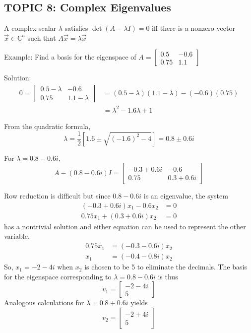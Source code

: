 \documentclass[12pt]{article} %
\begin{document}
\subsection{TOPIC 8: Complex Eigenvalues}
A complex scalar $\lambda$ satisfies $\det(A - \lambda I) = 0$ iff there is a nonzero vector $\vec{x} \in \mathbb{C}^n$ such that $A \vec{x} = \lambda \vec{x}$

Example: Find a basis for the eigenspace of $A = \begin{bmatrix}
	0.5 & -0.6\\
	0.75 & 1.1
\end{bmatrix}$

Solution:
\begin{align*}
	0 = \begin{vmatrix}
		0.5 - \lambda & -0.6\\
		0.75 & 1.1 - \lambda
	\end{vmatrix} &= (0.5 - \lambda)(1.1 - \lambda)- (-0.6)(0.75)\\
	&= \lambda^2 -1.6 \lambda + 1
\end{align*}

From the quadratic formula,
$$\lambda = \frac{1}{2}[1.6 \pm \sqrt{(-1.6)^2 - 4}] = 0.8 \pm 0.6i$$

For $\lambda = 0.8 - 0.6i$, 
$$A - (0.8 - 0.6i)I = \begin{bmatrix}
	-0.3 + 0.6i & -0.6\\
	0.75 & 0.3 + 0.6i
\end{bmatrix}$$

Row reduction is difficult but since $0.8 - 0.6i$ is an eigenvalue, the system 
\begin{align*}
	(-0.3 + 0.6i)x_1 - 0.6x_2 &= 0\\
	0.75x_1 + (0.3 + 0.6i)x_2 &= 0
\end{align*}
has a nontrivial solution and either equation can be used to represent the other variable. 
\begin{align*}
	0.75x_1 &= (-0.3-0.6i)x_2\\
	x_1 &= (-0.4 - 0.8i)x_2
\end{align*}
So, $x_1 = -2 - 4i$ when $x_2$ is chosen to be 5 to eliminate the decimals. The basis for the eigenspace corresponding to $\lambda = 0.8 - 0.6i$ is thus 
$$v_1 = \begin{bmatrix}
	-2 -4i\\
	5
\end{bmatrix}$$
Analogous calculations for $\lambda = 0.8 + 0.6i$ yields 
$$v_2 = \begin{bmatrix}
	-2 + 4i\\
	5
\end{bmatrix}$$
\end{document}
